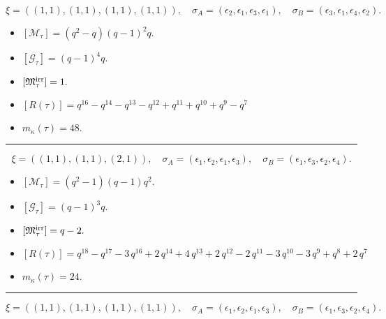 \documentclass[10pt,a4paper]{amsart}
\begin{document}
$$\xi = ({(1, 1)}, {(1, 1), (1, 1)}, {(1, 1)}),\quad \sigma_A = ({{\epsilon_2}}, {{\epsilon_1}, {\epsilon_3}}, {{\epsilon_1}}),\quad \sigma_B = ({{\epsilon_3}}, {{\epsilon_1}, {\epsilon_4}}, {{\epsilon_2}}).$$

\begin{itemize}
 \item $[\mathcal{M}_{\tau}] = {\left(q^{2} - q\right)} {\left(q - 1\right)}^{2} q .$

 \item $[\mathcal{G}_{\tau}] = {\left(q - 1\right)}^{4} q .$

 \item $[{\frak M}_{\tau}^{\textrm{irr}}] = 1 .$

 \item $[R(\tau)] = q^{16} - q^{14} - q^{13} - q^{12} + q^{11} + q^{10} + q^{9} - q^{7} $

 \item $m_{\kappa}(\tau) = 48 .$

 \end{itemize}
\noindent\rule{8cm}{0.4pt}

$$\xi = ({(1, 1)}, {(1, 1)}, {(2, 1)}),\quad \sigma_A = ({{\epsilon_1}}, {{\epsilon_2}}, {{\epsilon_1, \epsilon_3}}),\quad \sigma_B = ({{\epsilon_1}}, {{\epsilon_3}}, {{\epsilon_2, \epsilon_4}}).$$

\begin{itemize}
 \item $[\mathcal{M}_{\tau}] = {\left(q^{2} - 1\right)} {\left(q - 1\right)} q^{2} .$

 \item $[\mathcal{G}_{\tau}] = {\left(q - 1\right)}^{3} q .$

 \item $[{\frak M}_{\tau}^{\textrm{irr}}] = q - 2 .$

 \item $[R(\tau)] = q^{18} - q^{17} - 3 \, q^{16} + 2 \, q^{14} + 4 \, q^{13} + 2 \, q^{12} - 2 \, q^{11} - 3 \, q^{10} - 3 \, q^{9} + q^{8} + 2 \, q^{7} $

 \item $m_{\kappa}(\tau) = 24 .$

 \end{itemize}
\noindent\rule{8cm}{0.4pt}

$$\xi = ({(1, 1)}, {(1, 1)}, {(1, 1), (1, 1)}),\quad \sigma_A = ({{\epsilon_1}}, {{\epsilon_2}}, {{\epsilon_1}, {\epsilon_3}}),\quad \sigma_B = ({{\epsilon_1}}, {{\epsilon_3}}, {{\epsilon_2}, {\epsilon_4}}).$$
\end{document}
